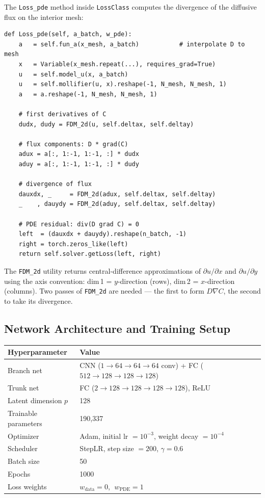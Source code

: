\documentclass[11pt]{article}
\begin{document}
The \texttt{Loss\_pde} method inside \texttt{LossClass} computes the
divergence of the diffusive flux on the interior mesh:

\begin{lstlisting}
def Loss_pde(self, a_batch, w_pde):
    a   = self.fun_a(x_mesh, a_batch)           # interpolate D to mesh
    x   = Variable(x_mesh.repeat(...), requires_grad=True)
    u   = self.model_u(x, a_batch)
    u   = self.mollifier(u, x).reshape(-1, N_mesh, N_mesh, 1)
    a   = a.reshape(-1, N_mesh, N_mesh, 1)

    # first derivatives of C
    dudx, dudy = FDM_2d(u, self.deltax, self.deltay)

    # flux components: D * grad(C)
    adux = a[:, 1:-1, 1:-1, :] * dudx
    aduy = a[:, 1:-1, 1:-1, :] * dudy

    # divergence of flux
    dauxdx, _     = FDM_2d(adux, self.deltax, self.deltay)
    _    , dauydy = FDM_2d(aduy, self.deltax, self.deltay)

    # PDE residual: div(D grad C) = 0
    left  = (dauxdx + dauydy).reshape(n_batch, -1)
    right = torch.zeros_like(left)
    return self.solver.getLoss(left, right)
\end{lstlisting}

\noindent The \texttt{FDM\_2d} utility returns central-difference
approximations of $\partial u/\partial x$ and $\partial u/\partial y$
using the axis convention: dim\,1 = $y$-direction (rows), dim\,2 =
$x$-direction (columns).  Two passes of \texttt{FDM\_2d} are needed —
the first to form $D\nabla C$, the second to take its divergence.

\subsection{Network Architecture and Training Setup}

\begin{center}
\begin{tabular}{ll}
  \toprule
  Hyperparameter & Value \\
  \midrule
  Branch net & CNN ($1\to64\to64\to64$ conv) + FC ($512\to128\to128\to128$) \\
  Trunk net  & FC ($2\to128\to128\to128\to128$), ReLU \\
  Latent dimension $p$ & 128 \\
  Trainable parameters & 190,337 \\
  \midrule
  Optimizer & Adam, initial lr $= 10^{-3}$, weight decay $= 10^{-4}$ \\
  Scheduler & StepLR, step size $= 200$, $\gamma = 0.6$ \\
  Batch size & 50 \\
  Epochs & 1000 \\
  Loss weights & $w_\text{data} = 0$, $\;w_\text{PDE} = 1$ \\
  \bottomrule
\end{tabular}
\end{center}
\end{document}
